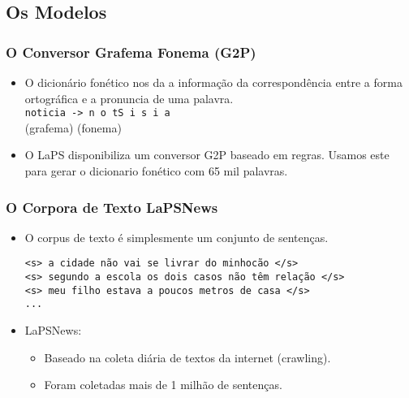 \documentclass{beamer}
\begin{document}
\subsection{Os Modelos}
\begin{frame}
   \frametitle{O Conversor Grafema Fonema (G2P)}
   \begin{itemize}
      \item O dicionário fonético nos da a informação da correspondência
      entre a forma ortográfica e a pronuncia de uma palavra.\\
      {\centering \Large \texttt{noticia ->  n o tS i s i a}\\}
      \hspace{40pt} (grafema) \hspace{65pt} (fonema)\\[5pt]
   \end{itemize}
   \begin{itemize}
      \pause
      \item O LaPS disponibiliza um conversor G2P baseado em regras. Usamos
      este para gerar o dicionario fonético com 65 mil palavras.
   \end{itemize}
\end{frame}


\begin{frame}[fragile]
   \frametitle{O Corpora de Texto LaPSNews}
   \begin{itemize}
      \item O corpus de texto é simplesmente um conjunto de sentenças.
      {\footnotesize
	 \begin{verbatim}
<s> a cidade não vai se livrar do minhocão </s>
<s> segundo a escola os dois casos não têm relação </s>
<s> meu filho estava a poucos metros de casa </s>
...
	    \end{verbatim}
      }
      \pause
      \item LaPSNews:
      \begin{itemize}
	 \item Baseado na coleta diária de textos da internet (crawling).
	 \item Foram coletadas mais de 1 milhão de sentenças.
      \end{itemize}
   \end{itemize}
\end{frame}
\end{document}
